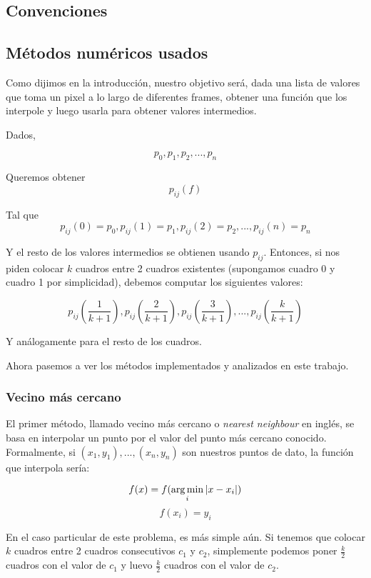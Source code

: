 \subsection{Convenciones}



\subsection{Métodos numéricos usados}

Como dijimos en la introducción, nuestro objetivo será, dada una lista de valores que toma un pixel a lo largo de diferentes frames, obtener una función que los interpole y luego usarla para obtener valores intermedios.

Dados,

\[ p_0, p_1, p_2, ..., p_n \]

Queremos obtener \[p_{ij}(f) \]

Tal que \[p_{ij}(0) = p_0, p_{ij}(1) = p_1, p_{ij}(2) = p_2, ..., p_{ij}(n) = p_n\]

Y el resto de los valores intermedios se obtienen usando $p_{ij}$. Entonces, si nos piden colocar $k$ cuadros entre 2 cuadros existentes (supongamos cuadro 0 y cuadro 1 por simplicidad), debemos computar los siguientes valores:

\[p_{ij}\left(\frac1{k+1}\right), p_{ij}\left(\frac2{k+1}\right), p_{ij}\left(\frac3{k+1}\right), ..., p_{ij}\left(\frac{k}{k+1}\right)\]

Y análogamente para el resto de los cuadros.

Ahora pasemos a ver los métodos implementados y analizados en este trabajo.


\subsubsection{Vecino más cercano}

El primer método, llamado vecino más cercano o \emph{nearest neighbour} en inglés, se basa en interpolar un punto por el valor del punto más cercano conocido. Formalmente, si $(x_1, y_1), ..., (x_n, y_n)$ son nuestros puntos de dato, la función que interpola sería:

\[ f(x) = f(\operatorname*{arg\,min}_{i} |x - x_i|) \]
\[ f(x_i) = y_i \]

En el caso particular de este problema, es más simple aún. Si tenemos que colocar $k$ cuadros entre 2 cuadros consecutivos $c_1$ y $c_2$, simplemente podemos poner $\frac{k}{2}$ cuadros con el valor de $c_1$ y luevo $\frac{k}{2}$ cuadros con el valor de $c_2$.


